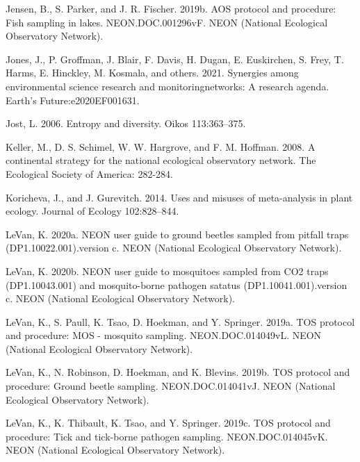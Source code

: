 \documentclass[
  12pt,
]{article}
\newlength{\cslhangindent}
\newlength{\cslentryspacingunit} %
\newenvironment{CSLReferences}[2] %
 {%
  \setlength{\parindent}{0pt}
  \ifodd #1
  \let\oldpar\par
  \def\par{\hangindent=\cslhangindent\oldpar}
  \fi
  \setlength{\parskip}{#2\cslentryspacingunit}
 }%
 {}
\begin{document}
\begin{CSLReferences}{1}{0}
\leavevmode{}%
Jensen, B., S. Parker, and J. R. Fischer. 2019b. AOS protocol and procedure: Fish sampling in lakes. NEON.DOC.001296vF. NEON (National Ecological Observatory Network).

\leavevmode{}%
Jones, J., P. Groffman, J. Blair, F. Davis, H. Dugan, E. Euskirchen, S. Frey, T. Harms, E. Hinckley, M. Kosmala, and others. 2021. Synergies among environmental science research and monitoringnetworks: A research agenda. Earth's Future:e2020EF001631.

\leavevmode{}%
Jost, L. 2006. Entropy and diversity. Oikos 113:363--375.

\leavevmode{}%
Keller, M., D. S. Schimel, W. W. Hargrove, and F. M. Hoffman. 2008. A continental strategy for the national ecological observatory network. The Ecological Society of America: 282-284.

\leavevmode{}%
Koricheva, J., and J. Gurevitch. 2014. Uses and misuses of meta-analysis in plant ecology. Journal of Ecology 102:828--844.

\leavevmode{}%
LeVan, K. 2020a. NEON user guide to ground beetles sampled from pitfall traps (DP1.10022.001).version c. NEON (National Ecological Observatory Network).

\leavevmode{}%
LeVan, K. 2020b. NEON user guide to mosquitoes sampled from CO2 traps (DP1.10043.001) and mosquito-borne pathogen satatus (DP1.10041.001).version c. NEON (National Ecological Observatory Network).

\leavevmode{}%
LeVan, K., S. Paull, K. Tsao, D. Hoekman, and Y. Springer. 2019a. TOS protocol and procedure: MOS - mosquito sampling. NEON.DOC.014049vL. NEON (National Ecological Observatory Network).

\leavevmode{}%
LeVan, K., N. Robinson, D. Hoekman, and K. Blevins. 2019b. TOS protocol and procedure: Ground beetle sampling. NEON.DOC.014041vJ. NEON (National Ecological Observatory Network).

\leavevmode{}%
LeVan, K., K. Thibault, K. Tsao, and Y. Springer. 2019c. TOS protocol and procedure: Tick and tick-borne pathogen sampling. NEON.DOC.014045vK. NEON (National Ecological Observatory Network).


\end{CSLReferences}
\end{document}
